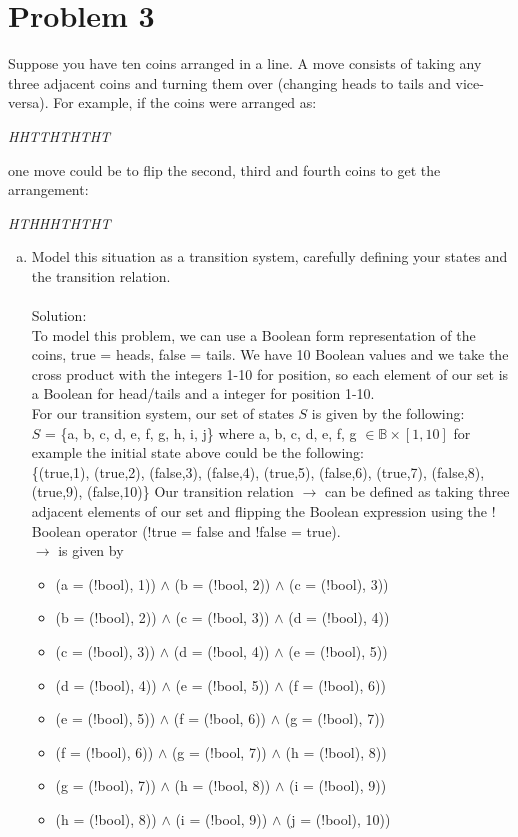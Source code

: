 \documentclass{article}
\newcommand*\moveToRight[1]{\hspace*{0em plus 1fill}\makebox{(#1)}}
\begin{document}
\section{Problem 3}
Suppose you have ten coins arranged in a line. A move consists of taking any three adjacent coins and turning them over (changing heads to tails and vice-versa). For example, if the coins were arranged as:
\begin{center}\textit{HHTTHTHTHT}\end{center}
one move could be to flip the second, third and fourth coins to get the arrangement:
\begin{center}\textit{HTHHHTHTHT}\end{center}
\begin{enumerate}[(a)]
    \item Model this situation as a transition system, carefully defining your states and the transition relation. \moveToRight{4 marks}\\\\
    Solution:\\
    To model this problem, we can use a Boolean form representation of the coins, true = heads, false = tails. We have 10 Boolean values and we take the  cross product with the integers 1-10 for position, so each element of our set is a Boolean for head/tails and a integer for position 1-10.
    \\For our transition system, our set of states $S$ is given by the following:\\
    $S$ = \{a, b, c, d, e, f, g, h, i, j\} where a, b, c, d, e, f, g $\in \mathbb{B}\times[1,10]$ 
    for example the initial state above could be the following:\\
    \{(true,1), (true,2), (false,3), (false,4), (true,5), (false,6), (true,7), (false,8), (true,9), (false,10)\}
    Our transition relation $\rightarrow$ can be defined as taking three adjacent elements of our set and flipping the Boolean expression using the ! Boolean operator (!true = false and !false = true).\\
    $\rightarrow$ is given by
    \begin{itemize}
        \item (a = (!bool), 1)) $\land$ (b = (!bool, 2)) $\land$ (c = (!bool), 3))
        \item (b = (!bool), 2)) $\land$ (c = (!bool, 3)) $\land$ (d = (!bool), 4))
        \item (c = (!bool), 3)) $\land$ (d = (!bool, 4)) $\land$ (e = (!bool), 5))
        \item (d = (!bool), 4)) $\land$ (e = (!bool, 5)) $\land$ (f = (!bool), 6))
        \item (e = (!bool), 5)) $\land$ (f = (!bool, 6)) $\land$ (g = (!bool), 7))
        \item (f = (!bool), 6)) $\land$ (g = (!bool, 7)) $\land$ (h = (!bool), 8))
        \item (g = (!bool), 7)) $\land$ (h = (!bool, 8)) $\land$ (i = (!bool), 9))
        \item (h = (!bool), 8)) $\land$ (i = (!bool, 9)) $\land$ (j = (!bool), 10))
    \end{itemize}
    

\end{enumerate}
\end{document}
